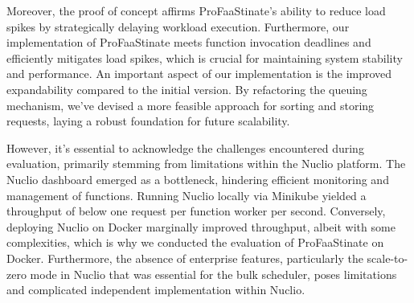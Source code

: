 
Moreover, the proof of concept affirms ProFaaStinate's ability to reduce load spikes by strategically delaying workload execution.
Furthermore, our implementation of ProFaaStinate meets function invocation deadlines and efficiently mitigates load spikes, which is crucial for maintaining system stability and performance.
An important aspect of our implementation is the improved expandability compared to the initial version.
By refactoring the queuing mechanism, we've devised a more feasible approach for sorting and storing requests, laying a robust foundation for future scalability.


However, it's essential to acknowledge the challenges encountered during evaluation, primarily stemming from limitations within the Nuclio platform.
The Nuclio dashboard emerged as a bottleneck, hindering efficient monitoring and management of functions.
Running Nuclio locally via Minikube yielded a throughput of below one request per function worker per second.
Conversely, deploying Nuclio on Docker marginally improved throughput, albeit with some complexities, which is why we conducted the evaluation of ProFaaStinate on Docker.
Furthermore, the absence of enterprise features, particularly the scale-to-zero mode in Nuclio that was essential for the bulk scheduler, poses limitations and complicated independent implementation within Nuclio.


